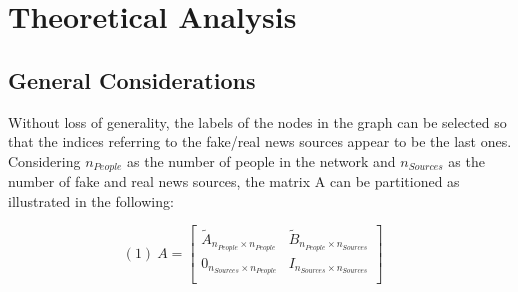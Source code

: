 \section{Theoretical Analysis}
\subsection{General Considerations}
Without loss of generality, the labels of the nodes in the graph can be selected so that the indices referring to the fake/real news sources appear to be the last ones. Considering $n_{People}$ as the number of people in the network and $n_{Sources}$ as the number of fake and real news sources, the matrix A can be partitioned as illustrated in the following:

$$
(1)\ A = 
\begin{bmatrix}
	\tilde{A}_{n_{People} \times n_{People}} & \tilde{B}_{n_{People} \times n_{Sources}} \\
	0_{n_{Sources} \times n_{People}} & I_{n_{Sources} \times n_{Sources}} \\
\end{bmatrix} 
\quad
$$

